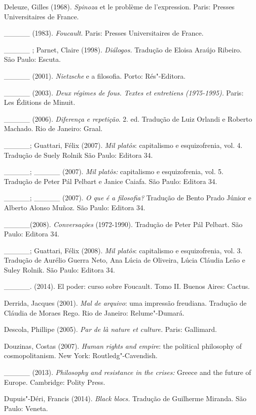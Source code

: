 Deleuze, Gilles (1968). \emph{Spinoza} et le problème de l'expression.
Paris: Presses Universitaires de France.

\_\_\_\_\_ (1983). \emph{Foucault}. Paris: Presses Universitaires de
France.

\_\_\_\_\_ ; Parnet, Claire (1998). \emph{Diálogos.} Tradução de Eloisa
Araújo Ribeiro. São Paulo: Escuta.

\_\_\_\_\_ (2001). \emph{Nietzsche} e a filosofia. Porto: Rés"-Editora.

\_\_\_\_\_ (2003). \emph{Deux régimes de fous. Textes et entretiens
(1975-1995). }Paris: Les Éditions de Minuit.

\_\_\_\_\_ (2006). \emph{Diferença e repetição}. 2. ed. Tradução de Luiz
Orlandi e Roberto Machado. Rio de Janeiro: Graal.

\_\_\_\_\_; Guattari, Félix (2007). \emph{Mil platôs}: capitalismo e
esquizofrenia, vol. 4. Tradução de Suely Rolnik São Paulo: Editora 34.

\_\_\_\_\_; \_\_\_\_\_ (2007). \emph{Mil platôs: }capitalismo e
esquizofrenia, vol. 5. Tradução de Peter Pál Pelbart e Janice Caiafa.
São Paulo: Editora 34.

\_\_\_\_\_; \_\_\_\_\_ (2007). \emph{O que é a filosofia? }Tradução de
Bento Prado Júnior e Alberto Alonso Muñoz. São Paulo: Editora 34.

\_\_\_\_\_(2008). \emph{Conversações} (1972-1990). Tradução de Peter Pál
Pelbart. São Paulo: Editora 34.

\_\_\_\_\_; Guattari, Félix (2008). \emph{Mil platôs}: capitalismo e
esquizofrenia, vol. 3. Tradução de Aurélio Guerra Neto, Ana Lúcia de
Oliveira, Lúcia Cláudia Leão e Suley Rolnik. São Paulo: Editora 34.

\_\_\_\_\_. (2014). El poder: curso sobre Foucault. Tomo II. Buenos
Aires: Cactus.

Derrida, Jacques (2001). \emph{Mal de arquivo}: uma impressão freudiana.
Tradução de Cláudia de Moraes Rego. Rio de Janeiro: Relume"-Dumará.

Descola, Phillipe (2005). \emph{Par de là nature et culture. }Paris:
Gallimard.

Douzinas, Costas (2007). \emph{Human rights and empire}: the political
philosophy of cosmopolitanism. New York: Routledg"-Cavendish.

\_\_\_\_\_ (2013). \emph{Philosophy and resistance in the crises:
}Greece and the future of Europe. Cambridge: Polity Press.

Dupuis"-Déri, Francis (2014). \emph{Black blocs. }Tradução de Guilherme
Miranda. São Paulo: Veneta.


